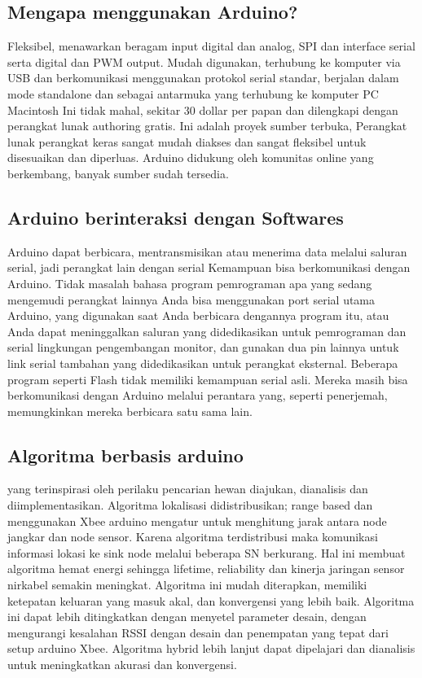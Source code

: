 \subsection{Mengapa menggunakan Arduino?}
Fleksibel, menawarkan beragam input digital dan analog, SPI dan interface serial serta digital dan PWM
output. Mudah digunakan, terhubung ke komputer via USB dan berkomunikasi menggunakan protokol serial standar, berjalan
dalam mode standalone dan sebagai antarmuka yang terhubung ke komputer PC  Macintosh
Ini tidak mahal, sekitar 30 dollar per papan dan dilengkapi dengan perangkat lunak authoring gratis. Ini adalah proyek sumber terbuka,
Perangkat lunak  perangkat keras sangat mudah diakses dan sangat fleksibel untuk disesuaikan dan diperluas. Arduino didukung
oleh komunitas online yang berkembang, banyak sumber sudah tersedia.

\subsection{Arduino berinteraksi dengan Softwares}
Arduino dapat berbicara, mentransmisikan atau menerima data melalui saluran serial, jadi perangkat lain dengan serial
Kemampuan bisa berkomunikasi dengan Arduino. Tidak masalah bahasa program pemrograman apa yang sedang mengemudi
perangkat lainnya Anda bisa menggunakan port serial utama Arduino, yang digunakan saat Anda berbicara dengannya
program itu, atau Anda dapat meninggalkan saluran yang didedikasikan untuk pemrograman dan serial lingkungan pengembangan
monitor, dan gunakan dua pin lainnya untuk link serial tambahan yang didedikasikan untuk perangkat eksternal. Beberapa program seperti
Flash tidak memiliki kemampuan serial asli. Mereka masih bisa berkomunikasi dengan Arduino melalui perantara
yang, seperti penerjemah, memungkinkan mereka berbicara satu sama lain.

\subsection{Algoritma berbasis arduino} 
yang terinspirasi oleh perilaku pencarian hewan diajukan, dianalisis dan diimplementasikan. Algoritma lokalisasi didistribusikan; range based dan menggunakan Xbee arduino mengatur untuk menghitung jarak antara node jangkar dan node sensor. Karena algoritma terdistribusi maka komunikasi informasi lokasi ke sink node melalui beberapa SN berkurang. Hal ini membuat algoritma hemat energi sehingga lifetime, reliability dan kinerja jaringan sensor nirkabel semakin meningkat. Algoritma ini mudah diterapkan, memiliki ketepatan keluaran yang masuk akal, dan konvergensi yang lebih baik. Algoritma ini dapat lebih ditingkatkan dengan menyetel parameter desain, dengan mengurangi kesalahan RSSI dengan desain dan penempatan yang tepat dari setup arduino Xbee. Algoritma hybrid lebih lanjut dapat dipelajari dan dianalisis untuk meningkatkan akurasi dan konvergensi.

